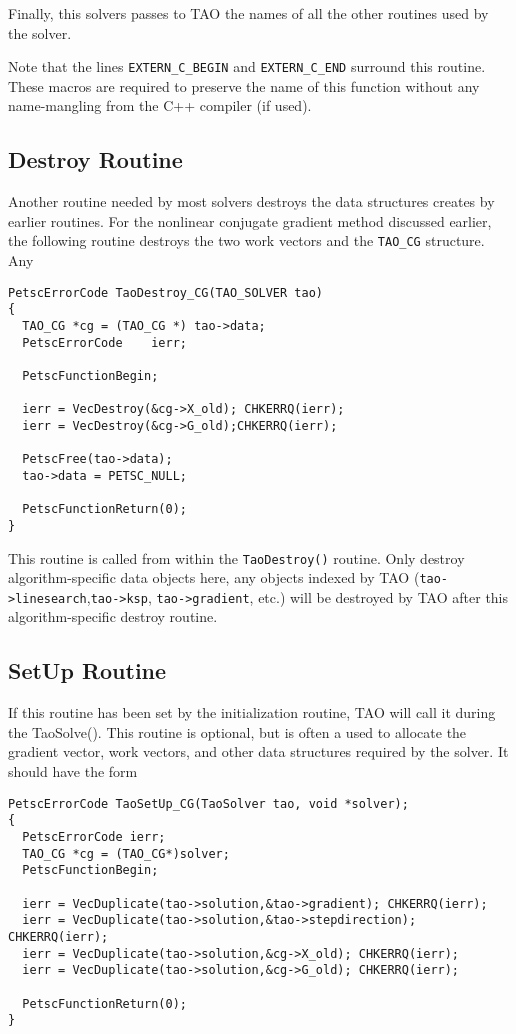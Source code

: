 Finally, this solvers passes to TAO the names of all the other routines
used by the solver.  

Note that the lines {\tt EXTERN\_C\_BEGIN} and {\tt EXTERN\_C\_END} surround
this routine.  These macros are required to preserve the name of this
function without any name-mangling from the C++ compiler (if used).

\subsection{Destroy Routine}
Another routine needed by most solvers destroys the data structures
creates by earlier routines.  For the nonlinear conjugate gradient
method discussed earlier, the following routine destroys the two
work vectors and the {\tt TAO\_CG} structure. Any 
\begin{verbatim}
PetscErrorCode TaoDestroy_CG(TAO_SOLVER tao)
{
  TAO_CG *cg = (TAO_CG *) tao->data;
  PetscErrorCode    ierr;

  PetscFunctionBegin;

  ierr = VecDestroy(&cg->X_old); CHKERRQ(ierr);
  ierr = VecDestroy(&cg->G_old);CHKERRQ(ierr);

  PetscFree(tao->data);
  tao->data = PETSC_NULL;

  PetscFunctionReturn(0);
}
\end{verbatim}
This routine is called from within the {\tt TaoDestroy()} routine.
Only destroy algorithm-specific data objects here, any objects indexed by 
TAO ({\tt tao->linesearch},{\tt tao->ksp}, {\tt tao->gradient}, etc.)
will be destroyed by TAO after this algorithm-specific destroy routine.


\subsection{SetUp Routine}
If this routine has been set by the initialization routine, TAO
will call it during the TaoSolve().
This routine is optional, but is often a used to allocate
the gradient vector, work vectors, and other data structures 
required by the solver.
It should have the form
\begin{verbatim}
PetscErrorCode TaoSetUp_CG(TaoSolver tao, void *solver);
{
  PetscErrorCode ierr;
  TAO_CG *cg = (TAO_CG*)solver;
  PetscFunctionBegin;

  ierr = VecDuplicate(tao->solution,&tao->gradient); CHKERRQ(ierr);
  ierr = VecDuplicate(tao->solution,&tao->stepdirection); CHKERRQ(ierr);
  ierr = VecDuplicate(tao->solution,&cg->X_old); CHKERRQ(ierr);
  ierr = VecDuplicate(tao->solution,&cg->G_old); CHKERRQ(ierr);

  PetscFunctionReturn(0);
}
\end{verbatim}

